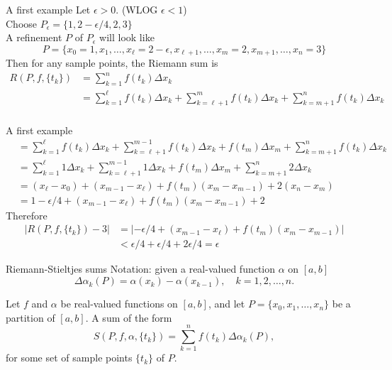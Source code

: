 \documentclass{beamer}
\begin{document}
\begin{frame}{A first example}
Let $\epsilon > 0$. \pause(WLOG $\epsilon < 1$)\\
Choose $P_\epsilon = \{1,2-\epsilon/4,2, 3\}$\\
A refinement $P$ of $P_\epsilon$ will look like
$$P = \{x_0=1,x_1,\dots, x_{\ell}=2-\epsilon,x_{\ell+1},\dots,x_m=2,x_{m+1},\dots, x_n=3\}$$
Then for any sample points, the Riemann sum is
\begin{align*}
R(P,f,\{t_k\})
  & = \sum_{k=1}^n f(t_k)\Delta x_k\\
  & = \sum_{k=1}^\ell f(t_k)\Delta x_k + \sum_{k=\ell+1}^m f(t_k)\Delta x_k + \sum_{k=m+1}^n f(t_k)\Delta x_k\\
\end{align*}
\end{frame}

\begin{frame}{A first example}
\begin{align*}
  & = \sum_{k=1}^\ell f(t_k)\Delta x_k + \sum_{k=\ell+1}^{m-1} f(t_k)\Delta x_k + f(t_m)\Delta x_m + \sum_{k=m+1}^n f(t_k)\Delta x_k\\
  & = \sum_{k=1}^\ell 1\Delta x_k + \sum_{k=\ell+1}^{m-1} 1\Delta x_k + f(t_m)\Delta x_m + \sum_{k=m+1}^n 2\Delta x_k\\
  & = (x_\ell-x_0) + (x_{m-1}-x_{\ell}) + f(t_m)(x_m-x_{m-1}) + 2(x_n-x_{m})\\
  & = 1-\epsilon/4 + (x_{m-1}-x_{\ell}) + f(t_m)(x_m-x_{m-1}) + 2
\end{align*}
Therefore 
\begin{align*}
|R(P,f,\{t_k\})-3|
  & = |-\epsilon/4 + (x_{m-1}-x_{\ell}) + f(t_m)(x_m-x_{m-1})|\\
  & < \epsilon/4 + \epsilon/4 + 2\epsilon/4 = \epsilon
\end{align*}
\end{frame}

\begin{frame}{Riemann-Stieltjes sums}
Notation: given a real-valued function $\alpha$ on $[a,b]$\\
$$\Delta \alpha_k(P) = \alpha(x_k)-\alpha(x_{k-1}),\quad k=1,2,\dots,n.$$
\pause
\begin{defn}
\pause
Let $f$ and $\alpha$ be real-valued functions on $[a,b]$, and let $P = \{x_0,x_1,\dots,x_n\}$ be a partition of $[a,b]$.
\pause
A sum of the form
$$S(P,f,\alpha,\{t_k\}) = \sum_{k=1}^n f(t_k) \Delta\alpha_k(P),$$
for some set of sample points $\{t_k\}$ of $P$.
\end{defn}
\end{frame}
\end{document}
